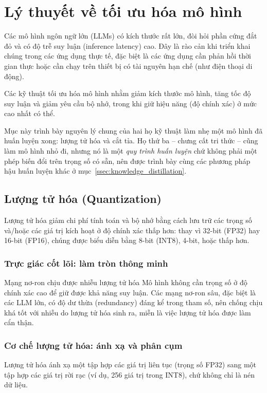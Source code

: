 
\section{Lý thuyết về tối ưu hóa mô hình}
\label{sec:model_optimization}

Các mô hình ngôn ngữ lớn (LLMs) có kích thước rất lớn, đòi hỏi phần cứng đắt đỏ và có độ trễ suy luận (inference latency) cao. Đây là rào cản khi triển khai chúng trong các ứng dụng thực tế, đặc biệt là các ứng dụng cần phản hồi thời gian thực hoặc cần chạy trên thiết bị có tài nguyên hạn chế (như điện thoại di động).

Các kỹ thuật tối ưu hóa mô hình nhằm giảm kích thước mô hình, tăng tốc độ suy luận và giảm yêu cầu bộ nhớ, trong khi giữ hiệu năng (độ chính xác) ở mức cao nhất có thể.

Mục này trình bày nguyên lý chung của hai họ kỹ thuật làm nhẹ một mô hình đã huấn luyện xong: lượng tử hóa và cắt tỉa. Họ thứ ba -- chưng cất tri thức -- cũng làm mô hình nhỏ đi, nhưng nó là một \emph{quy trình huấn luyện} chứ không phải một phép biến đổi trên trọng số có sẵn, nên được trình bày cùng các phương pháp hậu huấn luyện khác ở mục~\ref{ssec:knowledge_distillation}.

\subsection{Lượng tử hóa (Quantization)}
\label{ssec:quantization}
Lượng tử hóa giảm chi phí tính toán và bộ nhớ bằng cách lưu trữ các trọng số và/hoặc các giá trị kích hoạt ở độ chính xác thấp hơn: thay vì 32-bit (FP32) hay 16-bit (FP16), chúng được biểu diễn bằng 8-bit (INT8), 4-bit, hoặc thấp hơn.

\subsubsection{Trực giác cốt lõi: làm tròn thông minh}
\begin{keyidea}{Mạng nơ-ron chịu được nhiễu lượng tử hóa}
	Mô hình không cần trọng số ở độ chính xác cao để giữ được khả năng suy luận. Các mạng nơ-ron sâu, đặc biệt là các LLM lớn, có độ dư thừa (redundancy) đáng kể trong tham số, nên chống chịu khá tốt với nhiễu do lượng tử hóa sinh ra, miễn là việc lượng tử hóa được làm cẩn thận.
\end{keyidea}

\subsubsection{Cơ chế lượng tử hóa: ánh xạ và phân cụm}
Lượng tử hóa ánh xạ một tập hợp các giá trị liên tục (trọng số FP32) sang một tập hợp các giá trị rời rạc (ví dụ, 256 giá trị trong INT8), chứ không chỉ là nén dữ liệu.

